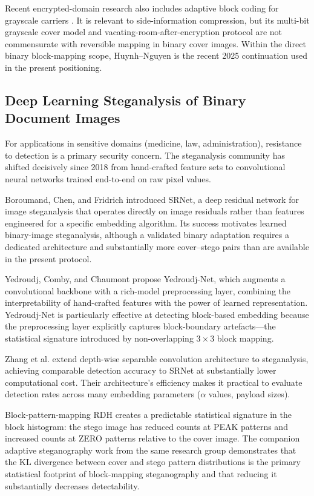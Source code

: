 \documentclass[a4paper,fleqn]{cas-dc}
\begin{document}
Recent encrypted-domain research also includes adaptive block coding for
grayscale carriers \cite{Xiao2024AdaptiveBlock}. It is relevant to
side-information compression, but its multi-bit grayscale cover model and
vacating-room-after-encryption protocol are not commensurate with reversible
mapping in binary cover images. Within the direct binary block-mapping scope,
Huynh--Nguyen \cite{Huynh2025BlockMapping} is the recent 2025 continuation
used in the present positioning.

\subsection{Deep Learning Steganalysis of Binary Document Images}

For applications in sensitive domains (medicine, law, administration), resistance to detection is a primary security concern. The steganalysis community has shifted decisively since 2018 from hand-crafted feature sets to convolutional neural networks trained end-to-end on raw pixel values.

Boroumand, Chen, and Fridrich \cite{Boroumand2019SRNet} introduced SRNet, a
deep residual network for image steganalysis that operates directly on image
residuals rather than features engineered for a specific embedding algorithm.
Its success motivates learned binary-image steganalysis, although a validated
binary adaptation requires a dedicated architecture and substantially more
cover--stego pairs than are available in the present protocol.

Yedroudj, Comby, and Chaumont \cite{Yedroudj2018Net} propose Yedroudj-Net, which augments a convolutional backbone with a rich-model preprocessing layer, combining the interpretability of hand-crafted features with the power of learned representation. Yedroudj-Net is particularly effective at detecting block-based embedding because the preprocessing layer explicitly captures block-boundary artefacts---the statistical signature introduced by non-overlapping $3\times3$ block mapping.

Zhang et al. \cite{Zhang2019SRNet} extend depth-wise separable convolution architecture to steganalysis, achieving comparable detection accuracy to SRNet at substantially lower computational cost. Their architecture's efficiency makes it practical to evaluate detection rates across many embedding parameters ($\alpha$ values, payload sizes).

Block-pattern-mapping RDH creates a predictable statistical signature in the block histogram: the stego image has reduced counts at PEAK patterns and increased counts at ZERO patterns relative to the cover image. The companion adaptive steganography work from the same research group \cite{Ekodeck2026Combi} demonstrates that the KL divergence between cover and stego pattern distributions is the primary statistical footprint of block-mapping steganography and that reducing it substantially decreases detectability.
\end{document}
